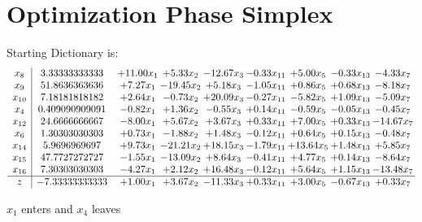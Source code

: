 \documentclass[9pt]{article}
\begin{document}
\section{Optimization Phase Simplex}
Starting Dictionary is:
\[\begin{array}{c| c c@{\hskip 2pt} c@{\hskip 2pt} c@{\hskip 2pt} c@{\hskip 2pt} c@{\hskip 2pt} c@{\hskip 2pt} c@{\hskip 2pt} }
 x_{8}   &  3.33333333333 & + 11.00 x_{1} & +  5.33 x_{2} & -12.67 x_{3} & -0.33 x_{11} & +  5.00 x_{5} & -0.33 x_{13} & -4.33 x_{7}\\
 x_{9}   &  51.8636363636 & +  7.27 x_{1} & -19.45 x_{2} & +  5.18 x_{3} & -1.05 x_{11} & +  0.86 x_{5} & +  0.68 x_{13} & -8.18 x_{7}\\
 x_{10}   &  7.18181818182 & +  2.64 x_{1} & -0.73 x_{2} & + 20.09 x_{3} & -0.27 x_{11} & -5.82 x_{5} & +  1.09 x_{13} & -5.09 x_{7}\\
 x_{4}   &  0.409090909091 & -0.82 x_{1} & +  1.36 x_{2} & -0.55 x_{3} & +  0.14 x_{11} & -0.59 x_{5} & -0.05 x_{13} & -0.45 x_{7}\\
 x_{12}   &  24.6666666667 & -8.00 x_{1} & +  5.67 x_{2} & +  3.67 x_{3} & +  0.33 x_{11} & +  7.00 x_{5} & +  0.33 x_{13} & -14.67 x_{7}\\
 x_{6}   &  1.30303030303 & +  0.73 x_{1} & -1.88 x_{2} & +  1.48 x_{3} & -0.12 x_{11} & +  0.64 x_{5} & +  0.15 x_{13} & -0.48 x_{7}\\
 x_{14}   &  5.9696969697 & +  9.73 x_{1} & -21.21 x_{2} & + 18.15 x_{3} & -1.79 x_{11} & + 13.64 x_{5} & +  1.48 x_{13} & +  5.85 x_{7}\\
 x_{15}   &  47.7727272727 & -1.55 x_{1} & -13.09 x_{2} & +  8.64 x_{3} & -0.41 x_{11} & +  4.77 x_{5} & +  0.14 x_{13} & -8.64 x_{7}\\
 x_{16}   &  7.30303030303 & -4.27 x_{1} & +  2.12 x_{2} & + 16.48 x_{3} & -0.12 x_{11} & +  5.64 x_{5} & +  1.15 x_{13} & -13.48 x_{7}\\
\hline
z    &  -7.33333333333 & +  1.00 x_{1} & +  3.67 x_{2} & -11.33 x_{3} & +  0.33 x_{11} & +  3.00 x_{5} & -0.67 x_{13} & +  0.33 x_{7}\\
\end{array}\]


 $ x_{1} $ enters and $ x_{4} $ leaves 
\end{document}
